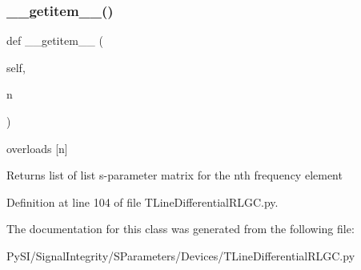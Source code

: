 \subsubsection{\texorpdfstring{\+\_\+\+\_\+getitem\+\_\+\+\_\+()}{\_\_getitem\_\_()}}
{\footnotesize\ttfamily def \+\_\+\+\_\+getitem\+\_\+\+\_\+ (\begin{DoxyParamCaption}\item[{}]{self,  }\item[{}]{n }\end{DoxyParamCaption})}



overloads \mbox{[}n\mbox{]} 

\begin{DoxyReturn}{Returns}
list of list s-\/parameter matrix for the nth frequency element 
\end{DoxyReturn}


Definition at line 104 of file T\+Line\+Differential\+R\+L\+G\+C.\+py.



The documentation for this class was generated from the following file\+:\begin{DoxyCompactItemize}
\item 
Py\+S\+I/\+Signal\+Integrity/\+S\+Parameters/\+Devices/T\+Line\+Differential\+R\+L\+G\+C.\+py\end{DoxyCompactItemize}
